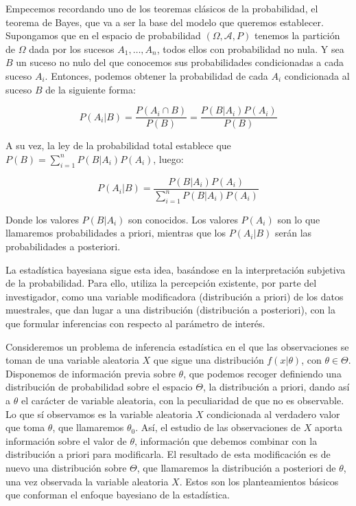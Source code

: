 \documentclass{article}
\begin{document}
Empecemos recordando uno de los teoremas clásicos de la probabilidad, el teorema de Bayes, que va a ser la base del modelo que queremos establecer. Supongamos que en el espacio de probabilidad $(\Omega,\mathcal{A},P)$ tenemos la partición de $\Omega$ dada por los sucesos $A_1,\dots,A_n$, todos ellos con probabilidad no nula. Y sea $B$ un suceso no nulo del que conocemos sus probabilidades condicionadas a cada suceso $A_i$. Entonces, podemos obtener la probabilidad de cada $A_i$ condicionada al suceso $B$ de la siguiente forma:

\begin{equation*}
	P(A_i|B)=\frac{P(A_i\cap B)}{P(B)}=\frac{P(B|A_i)P(A_i)}{P(B)}
\end{equation*}

A su vez, la ley de la probabilidad total establece que $P(B)=\sum_{i=1}^n{P(B|A_i)P(A_i)}$, luego:

\begin{equation*}
	P(A_i|B)=\frac{P(B|A_i)P(A_i)}{\sum_{i=1}^n{P(B|A_i)P(A_i)}}
\end{equation*}

Donde los valores $P(B|A_i)$ son conocidos. Los valores $P(A_i)$ son lo que llamaremos probabilidades a priori, mientras que los $P(A_i|B)$ serán las probabilidades a posteriori.

La estadística bayesiana sigue esta idea, basándose en la interpretación subjetiva de la probabilidad. Para ello, utiliza la percepción existente, por parte del investigador, como una variable modificadora (distribución a priori) de los datos muestrales, que dan lugar a una distribución (distribución a posteriori), con la que formular inferencias con respecto al parámetro de interés.

Consideremos un problema de inferencia estadística en el que las observaciones se toman de una variable aleatoria $X$ que sigue una distribución $f(x|\theta)$, con $\theta\in\Theta$. Disponemos de información previa sobre $\theta$, que podemos recoger definiendo una distribución de probabilidad sobre el espacio $\Theta$, la distribución a priori, dando así a $\theta$ el carácter de variable aleatoria, con la peculiaridad de que no es observable. Lo que sí observamos es la variable aleatoria $X$ condicionada al verdadero valor que toma $\theta$, que llamaremos $\theta_0$. Así, el estudio de las observaciones de $X$ aporta información sobre el valor de $\theta$, información que debemos combinar con la distribución a priori para modificarla. El resultado de esta modificación es de nuevo una distribución sobre $\Theta$, que llamaremos la distribución a posteriori de $\theta$, una vez observada la variable aleatoria $X$. Estos son los planteamientos básicos que conforman el enfoque bayesiano de la estadística.
\end{document}
